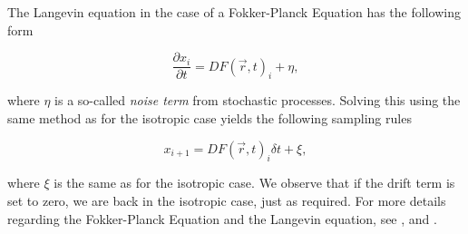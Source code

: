 The Langevin equation in the case of a Fokker-Planck Equation has the following form

\begin{equation}
 \frac{\partial x_i}{\partial t} = D F(\vec r, t)_i + \eta,
\end{equation}

where $\eta$ is a so-called \textit{noise term} from stochastic processes. Solving this using the same method as for the isotropic case yields the following sampling rules

\begin{equation}
 x_{i+1} = DF(\vec r, t)_i\delta t + \xi,
\end{equation}

where $\xi$ is the same as for the isotropic case. We observe that if the drift term is set to zero, we are back in the isotropic case, just as required. For more details regarding the Fokker-Planck Equation and the Langevin equation, see \cite{Gardiner:2004bk}, \cite{risken1989fpe} and \cite{langevin}.





